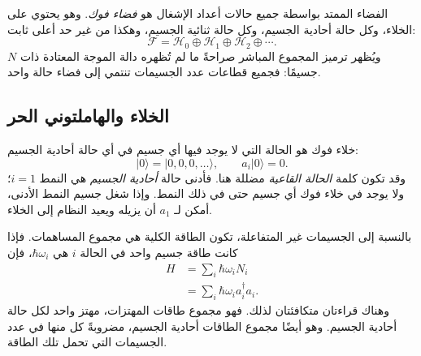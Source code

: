 الفضاء الممتد بواسطة جميع حالات أعداد الإشغال هو \emph{فضاء فوك}. وهو يحتوي على الخلاء، وكل حالة أحادية الجسيم، وكل حالة ثنائية الجسيم، وهكذا من غير حد أعلى ثابت:
\begin{equation}
\mathcal F=\mathcal H_0\oplus\mathcal H_1\oplus\mathcal H_2\oplus\cdots.
\label{eq:l06-fock-space}
\end{equation}
ويُظهر ترميز المجموع المباشر صراحةً ما لم تُظهره دالة الموجة المعتادة ذات \(N\) جسيمًا: فجميع قطاعات عدد الجسيمات تنتمي إلى فضاء حالة واحد.

\begin{classroomqa}
\end{classroomqa}

\subsection{الخلاء والهاملتوني الحر}

خلاء فوك هو الحالة التي لا يوجد فيها أي جسيم في أي حالة أحادية الجسيم:
\begin{equation}
|0\rangle=|0,0,0,\ldots\rangle,
\qquad a_i|0\rangle=0.
\end{equation}
وقد تكون كلمة \emph{الحالة القاعية} مضللة هنا. فأدنى حالة \emph{أحادية الجسيم} هي النمط \(i=1\)؛ ولا يوجد في خلاء فوك أي جسيم حتى في ذلك النمط. وإذا شغل جسيم النمط الأدنى، أمكن لـ \(a_1\) أن يزيله ويعيد النظام إلى الخلاء.

\begin{classroomqa}
\end{classroomqa}

بالنسبة إلى الجسيمات غير المتفاعلة، تكون الطاقة الكلية هي مجموع المساهمات. فإذا كانت طاقة جسيم واحد في الحالة \(i\) هي \(\hbar\omega_i\)، فإن
\begin{align}
H
&=\sum_i \hbar\omega_i N_i \\
&=\sum_i \hbar\omega_i a_i^\dagger a_i.
\label{eq:l06-free-fock-hamiltonian}
\end{align}
وهناك قراءتان متكافئتان لذلك. فهو مجموع طاقات المهتزات، مهتز واحد لكل حالة أحادية الجسيم. وهو أيضًا مجموع الطاقات أحادية الجسيم، مضروبةً كل منها في عدد الجسيمات التي تحمل تلك الطاقة.

